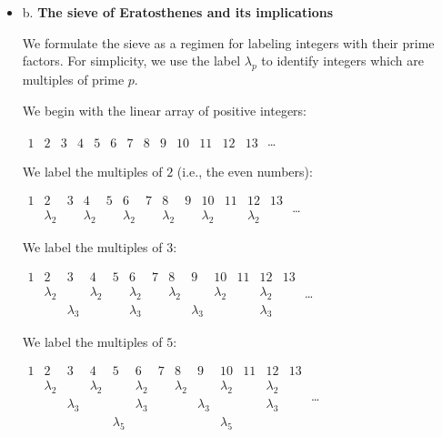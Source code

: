 \begin{itemize}
  \begin{itemize}
\item
b. {\bf The sieve of Eratosthenes and its implications}

We formulate the sieve as a regimen for labeling integers with their prime factors.  For simplicity, we use the label $\lambda_p$ to identify integers which are multiples of prime $p$.

\medskip

We begin with the linear array of positive integers:

$\begin{array}{c|c|c|c|c|c|c|c|c|c|c|c|c}
1 & 2 & 3 & 4 & 5 & 6 & 7 & 8 & 9 & 10 & 11 & 12 & 13
\end{array}$ \ldots

\medskip

We label the multiples of $2$ (i.e., the even numbers):

$\begin{array}{c|c|c|c|c|c|c|c|c|c|c|c|c}
1 & 2 & 3 & 4 & 5 & 6 & 7 & 8 & 9 & 10 & 11 & 12 & 13 \\
 & \lambda_2 & & \lambda_2 & & \lambda_2 & & \lambda_2 & & \lambda_2 & & \lambda_2 &
\end{array}$ \ldots

\medskip

We label the multiples of $3$:

$\begin{array}{c|c|c|c|c|c|c|c|c|c|c|c|c}
1 & 2 & 3 & 4 & 5 & 6 & 7 & 8 & 9 & 10 & 11 & 12 & 13 \\
 & \lambda_2 & & \lambda_2 & & \lambda_2 & & \lambda_2 & & \lambda_2 & & \lambda_2 & \\
 & & \lambda_3 & &  & \lambda_3 & & & \lambda_3 & & & \lambda_3 &
\end{array}$ \ldots

\medskip

We label the multiples of $5$:

$\begin{array}{c|c|c|c|c|c|c|c|c|c|c|c|c}
1 & 2 & 3 & 4 & 5 & 6 & 7 & 8 & 9 & 10 & 11 & 12 & 13 \\
 & \lambda_2 & & \lambda_2 & & \lambda_2 & & \lambda_2 & & \lambda_2 & & \lambda_2 & \\
 & & \lambda_3 & &  & \lambda_3 & & & \lambda_3 & & & \lambda_3 & \\
 & & & & \lambda_5 & & & & & \lambda_5 & & & 
\end{array}$ \ldots


\end{itemize}
\end{itemize}
